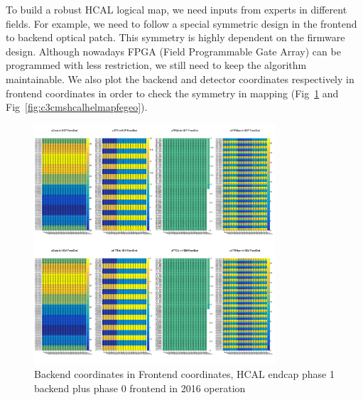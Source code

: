 To build a robust HCAL logical map, we need inputs from experts in different fields. For example, we need to follow a special symmetric design in the frontend to backend optical patch. This symmetry is highly dependent on the firmware design. Although nowadays FPGA (Field Programmable Gate Array) can be programmed with less restriction, we still need to keep the algorithm maintainable. We also plot the backend and detector coordinates respectively in frontend coordinates in order to check the symmetry in mapping (Fig~\ref{fig:c3cmshcalhelmapfebe} and Fig~\ref{fig:c3cmshcalhelmapfegeo}).

\begin{figure}[htbp]
 \begin{center}
  \includegraphics[width=0.8\textwidth]{figures/c3/c3_cms_hcalhelmapfebe.png}
 \end{center}
 \caption{Backend coordinates in Frontend coordinates, HCAL endcap phase 1 backend plus phase 0 frontend in 2016 operation}
 \label{fig:c3cmshcalhelmapfebe}
\end{figure}

